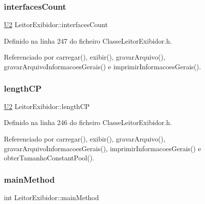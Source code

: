 \subsubsection{\texorpdfstring{interfaces\+Count}{interfacesCount}}
{\footnotesize\ttfamily \hyperlink{BasicTypes_8h_a90240657108b1b457eef9d3f76e0202e}{U2} Leitor\+Exibidor\+::interfaces\+Count\hspace{0.3cm}{\ttfamily [private]}}



Definido na linha 247 do ficheiro Classe\+Leitor\+Exibidor.\+h.



Referenciado por carregar(), exibir(), gravar\+Arquivo(), gravar\+Arquivo\+Informacoes\+Gerais() e imprimir\+Informacoes\+Gerais().

\mbox{\label{classLeitorExibidor_ae891dce6b86c2d09c1a112bd585561d6}} 
\subsubsection{\texorpdfstring{length\+CP}{lengthCP}}
{\footnotesize\ttfamily \hyperlink{BasicTypes_8h_a90240657108b1b457eef9d3f76e0202e}{U2} Leitor\+Exibidor\+::length\+CP\hspace{0.3cm}{\ttfamily [private]}}



Definido na linha 246 do ficheiro Classe\+Leitor\+Exibidor.\+h.



Referenciado por carregar(), exibir(), gravar\+Arquivo(), gravar\+Arquivo\+Informacoes\+Gerais(), imprimir\+Informacoes\+Gerais() e obter\+Tamanho\+Constant\+Pool().

\mbox{\label{classLeitorExibidor_a9e7a108ebca3fac0096fcb422f2393db}} 
\subsubsection{\texorpdfstring{main\+Method}{mainMethod}}
{\footnotesize\ttfamily int Leitor\+Exibidor\+::main\+Method\hspace{0.3cm}{\ttfamily [private]}}




